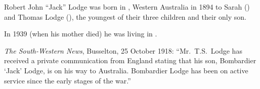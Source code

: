 
Robert John ``Jack'' Lodge was born in , Western Australia in 1894
to Sarah () and Thomas Lodge (),\cite{JackLodgeBirthCert}
the youngest of their three children and their only son.

In 1939 (when his mother died) he was living in .\cite{SCLdeathNotice}

\emph{The South-Western News}, Busselton, 25 October 1918:\cite{SouthWestern1918}
``Mr.\ T.S.\ Lodge has received a private communication from England
stating that his son, Bombardier `Jack' Lodge, is on his way to Australia.
Bombardier Lodge has been on active service since the early stages of the war.''
